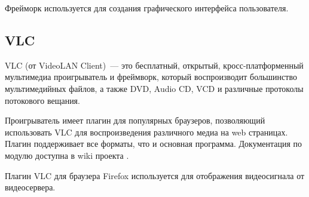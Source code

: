 Фрейморк используется для создания графического интерфейса пользователя.

\subsection{VLC}
VLC (от VideoLAN Client)~--- это бесплатный, открытый, кросс-платформенный мультимедиа
проигрыватель и фреймворк, который воспроизводит большинство мультимедийных файлов,
а также DVD, Audio CD, VCD и различные протоколы потокового вещания.

Проигрыватель имеет плагин для популярных браузеров, позволяющий использовать VLC для воспроизведения
различного медиа на web страницах. Плагин поддерживает все форматы, что и основная программа.
Документация по модулю доступна в wiki проекта \cite{vlc}.

Плагин VLC для браузера Firefox используется для отображения видеосигнала от видеосервера.
